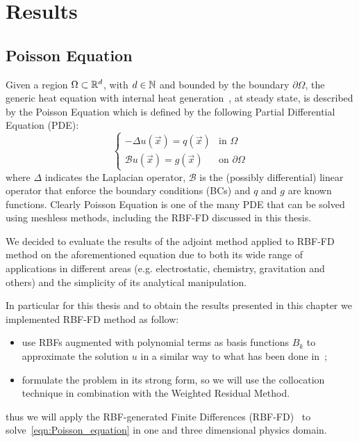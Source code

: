 \chapter{Results}

\section{Poisson Equation}
\label{sec:poisson_equation}

Given a region $\Omega \subset \mathbb{R}^d$, with $d \in \mathbb{N}$ and bounded by the boundary $\partial\Omega$, the generic heat equation with internal heat generation~\cite{Brezis:functional_analysis_book}, at steady state, is described by the Poisson Equation which is defined by the following Partial Differential Equation (PDE):
\begin{equation}
	\label{eqn:Poisson_equation}
	\begin{cases}
		- \Delta u(\vec{x}) = q(\vec{x})														 &  \text{in $\Omega$}							\\
		\mathcal{B} u(\vec{x}) = g(\vec{x})  																		&  \text{on $\partial\Omega$}
	\end{cases}
\end{equation}
where $\Delta$ indicates the Laplacian operator, $\mathcal{B}$ is the (possibly differential) linear operator that enforce the boundary conditions (BCs) and $q$ and $g$ are known functions. Clearly Poisson Equation is one of the many PDE that can be solved using meshless methods, including the RBF-FD discussed in this thesis.

We decided to evaluate the results of the adjoint method applied to RBF-FD method on the aforementioned equation due to both its wide range of applications in different areas	(e.g. electrostatic, chemistry, gravitation and others) and the simplicity of its analytical manipulation.

In particular for this thesis and to obtain the results presented in this chapter we implemented RBF-FD method as follow:
\begin{itemize}
	\item use RBFs augmented with polynomial terms as basis functions $B_k$ to approximate the solution $u$ in a similar way to what has been done in~\cite{Liu:Intro_to_meshfree_methods}; 
	\item formulate the problem in its strong form, so we will use the collocation technique in combination with the Weighted Residual Method.
\end{itemize}
thus we will apply the RBF-generated Finite Differences (RBF-FD)~\cite{Fornberg:RBF-FD_1, Fornberg:RBF-FD_2} to solve~\eqref{eqn:Poisson_equation} in one and three dimensional physics domain.

